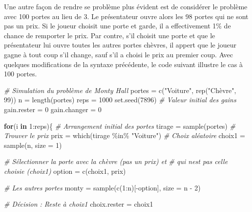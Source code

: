 \documentclass[
]{book}
\newenvironment{Shaded}{}{}
\newcommand{\AttributeTok}[1]{#1}
\newcommand{\CommentTok}[1]{\textit{#1}}
\newcommand{\ControlFlowTok}[1]{\textbf{#1}}
\newcommand{\DecValTok}[1]{#1}
\newcommand{\FunctionTok}[1]{#1}
\newcommand{\NormalTok}[1]{#1}
\newcommand{\OtherTok}[1]{#1}
\newcommand{\SpecialCharTok}[1]{#1}
\newcommand{\StringTok}[1]{#1}
\begin{document}
Une autre façon de rendre se problème plus évident est de considérer le problème avec 100 portes au lieu de 3. Le présentateur ouvre alors les 98 portes qui ne sont pas un prix. Si le joueur choisit une porte et garde, il a effectivement 1\% de chance de remporter le prix. Par contre, s'il choisit une porte et que le présentateur lui ouvre toutes les autres portes chèvres, il appert que le joueur gagne à tout coup s'il change, sauf s'il a choisi le prix au premier coup. Avec quelques modifications de la syntaxe précédente, le code suivant illustre le cas à 100 portes.

\begin{Shaded}
\begin{Highlighting}[]
\CommentTok{\# Simulation du problème de Monty Hall}
\NormalTok{portes }\OtherTok{=} \FunctionTok{c}\NormalTok{(}\StringTok{"Voiture"}\NormalTok{, }\FunctionTok{rep}\NormalTok{(}\StringTok{"Chèvre"}\NormalTok{, }\DecValTok{99}\NormalTok{))}
\NormalTok{n }\OtherTok{=} \FunctionTok{length}\NormalTok{(portes)}
\NormalTok{reps }\OtherTok{=} \DecValTok{1000}
\FunctionTok{set.seed}\NormalTok{(}\DecValTok{7896}\NormalTok{)}
\CommentTok{\# Valeur initial des gains}
\NormalTok{gain.rester }\OtherTok{=} \DecValTok{0}
\NormalTok{gain.changer }\OtherTok{=} \DecValTok{0}

\ControlFlowTok{for}\NormalTok{(i }\ControlFlowTok{in} \DecValTok{1}\SpecialCharTok{:}\NormalTok{reps)\{}
  \CommentTok{\# Arrangement initial des portes}
\NormalTok{  tirage }\OtherTok{=} \FunctionTok{sample}\NormalTok{(portes)}
  \CommentTok{\# Trouver le prix}
\NormalTok{  prix }\OtherTok{=} \FunctionTok{which}\NormalTok{(tirage }\SpecialCharTok{\%in\%} \StringTok{"Voiture"}\NormalTok{)}
  \CommentTok{\# Choix aléatoire}
\NormalTok{  choix1 }\OtherTok{=} \FunctionTok{sample}\NormalTok{(n, }\AttributeTok{size =} \DecValTok{1}\NormalTok{)}

  \CommentTok{\# Sélectionner la porte avec la chèvre (pas un prix) et}
  \CommentTok{\# qui n\textquotesingle{}est pas celle choisie (choix1)}
\NormalTok{  option }\OtherTok{=} \FunctionTok{c}\NormalTok{(choix1, prix)}

  \CommentTok{\# Les autres portes}
\NormalTok{  monty }\OtherTok{=} \FunctionTok{sample}\NormalTok{(}\FunctionTok{c}\NormalTok{(}\DecValTok{1}\SpecialCharTok{:}\NormalTok{n)[}\SpecialCharTok{{-}}\NormalTok{option], }\AttributeTok{size =}\NormalTok{ n }\SpecialCharTok{{-}} \DecValTok{2}\NormalTok{)}

  \CommentTok{\# Décision : Reste à choix1}
\NormalTok{  choix.rester }\OtherTok{=}\NormalTok{ choix1}


\end{Highlighting}
\end{Shaded}
\end{document}
